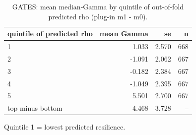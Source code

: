 \begin{table}[htbp]
\centering
\caption{GATES: mean median-Gamma by quintile of out-of-fold predicted rho (plug-in m1 - m0).}
\label{tab:agri_gates}
\begin{tabular}{lrrr}
\toprule
quintile of predicted rho & mean Gamma & se & n \\
\midrule
1 & 1.033 & 2.570 & 668 \\
2 & -1.091 & 2.062 & 667 \\
3 & -0.182 & 2.384 & 667 \\
4 & -1.049 & 2.395 & 667 \\
5 & 5.501 & 2.700 & 667 \\
top minus bottom & 4.468 & 3.728 & -- \\
\bottomrule
\end{tabular}
\par\smallskip\footnotesize Quintile 1 = lowest predicted resilience.
\end{table}
